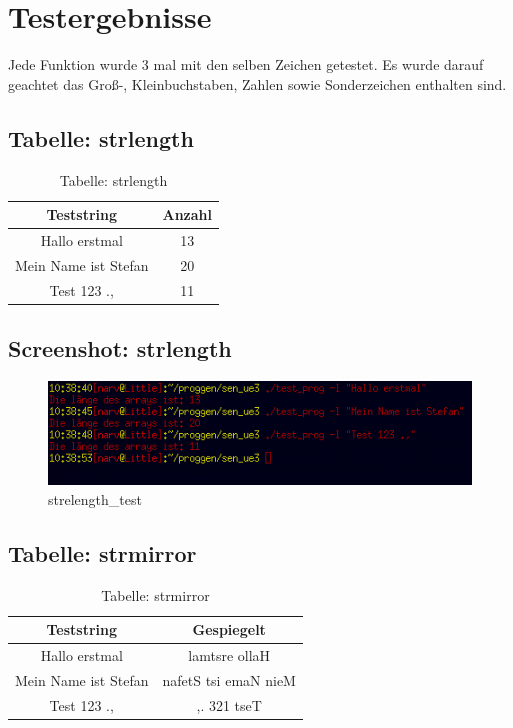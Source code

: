 \documentclass{scrartcl}
\begin{document}
\section{Testergebnisse}
Jede Funktion wurde 3 mal mit den selben Zeichen getestet. Es wurde darauf geachtet das Groß-, Kleinbuchstaben, Zahlen sowie Sonderzeichen enthalten sind.

\subsection{Tabelle: strlength}
\begin{table}[H]
  \centering
  \begin{tabular}{|c|c|}
    \hline
    Teststring & Anzahl \\
    \hline
    Hallo erstmal & 13 \\
    \hline
    Mein Name ist Stefan & 20 \\
    \hline
    Test 123 ., & 11 \\
    \hline
  \end{tabular}
  \caption{Tabelle: strlength}
\end{table}
\subsection{Screenshot: strlength}
\begin{figure}[H]
  \centering
  \includegraphics[width=0.9\linewidth]{images/strlength_test.png}
  \caption{strelength\_test}
  \label{fig:digraph}
\end{figure}

\newpage
\subsection{Tabelle: strmirror}
\begin{table}[H]
  \centering
  \begin{tabular}{|c|c|}
    \hline
    Teststring & Gespiegelt \\
    \hline
    Hallo erstmal & lamtsre ollaH \\
    \hline
    Mein Name ist Stefan & nafetS tsi emaN nieM \\
    \hline
    Test 123 ., & ,. 321 tseT \\
    \hline
  \end{tabular}
  \caption{Tabelle: strmirror}
\end{table}
\end{document}
